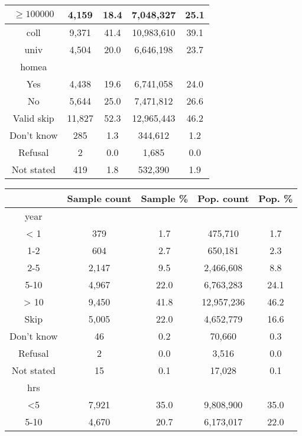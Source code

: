 \documentclass[11pt,twoside]{article}
\begin{document}
\begin{center}
\begin{tabular}{c||c|c|c|c}
$\geq 100000$& 4,159       &         18.4     &       7,048,327   &    25.1\\\hline
coll & 9,371       &        41.4       &     10,983,610    &39.1\\
univ & 4,504      &         20.0        &      6,646,198   &   23.7\\\hline
homea    &    &      &     &    \\
Yes & 4,438       &       19.6          &       6,741,058 &     24.0\\
No & 5,644        &      25.0         &        7,471,812 &     26.6\\
Valid skip & 11,827  &    52.3     &        12,965,443  &  46.2\\
Don’t know & 285     &         1.3      &     344,612 &        1.2\\
Refusal & 2      &          0.0       &        1,685 &              0.0\\
Not stated &   419       &       1.8      &     532,390 &          1.9\\\hline
\end{tabular}
\newpage
\begin{tabular}{c||c|c|c|c}
&Sample count&Sample \%&Pop. count&Pop. \%\\\hline
year    &    &      &     &    \\
< 1 &379       &          1.7        &         475,710  &      1.7\\
1-2&604       &           2.7       &         650,181  &      2.3\\
2-5&2,147     &          9.5        &        2,466,608 &    8.8\\
5-10&4,967     &         22.0        &       6,763,283  &   24.1\\
> 10&9,450     &         41.8        &      12,957,236  &  46.2\\
Skip&5,005     &         22.0        &       4,652,779  &  16.6\\
Don't know&46        &           0.2       &          70,660  &        0.3\\
Refusal&2         &            0.0      &           3,516   &         0.0\\
Not stated&15        &           0.1       &          17,028    &      0.1\\\hline
hrs    &    &      &     &    \\
<5 & 7,921   &   35.0     &  9,808,900 &    35.0\\
5-10 & 4,670    &      20.7   &           6,173,017 &    22.0\\

\end{tabular}
\end{center}
\end{document}
